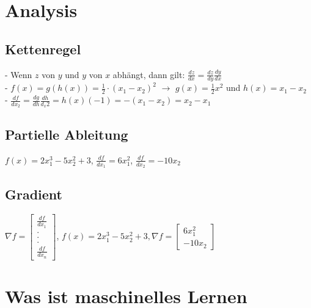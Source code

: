 \documentclass{report}
\begin{document}
\section{Analysis}
\subsection{Kettenregel}
- Wenn $z$ von $y$ und $y$ von $x$ abhängt, dann gilt: $\frac{dz}{dx} = \frac{dz}{dy}\frac{dy}{dx}$\\
- $f(x) = g(h(x)) = \frac{1}{2}\cdot(x_1 - x_2)^2$ $\rightarrow$ $g(x) = \frac{1}{2}x^2$ und $h(x) = x_1 - x_2$\\
- $\frac{df}{dx_2} = \frac{dg}{dh}\frac{dh}{d_x2} = h(x)(-1) = -(x_1 - x_2) = x_2 - x_1$
\subsection{Partielle Ableitung}
$f(x) = 2x_1^3 - 5x_2^2 + 3$, $\frac{df}{dx_1} = 6x_1^2$, $\frac{df}{dx_2} = -10x_2$
\subsection{Gradient}
$\nabla f = \begin{bmatrix}\frac{df}{dx_1}\\ . \\. \\.\\\frac{df}{dx_n}\end{bmatrix}$, $f(x) = 2x_1^3 - 5x_2^2 + 3, \nabla f = \begin{bmatrix}6x_1^2\\-10x_2\end{bmatrix}$

\section{Was ist maschinelles Lernen}
\end{document}
